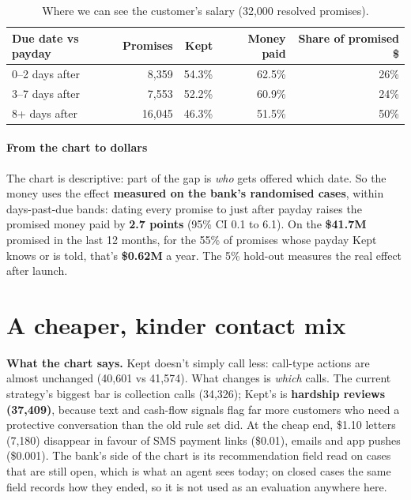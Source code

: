 \documentclass[11pt]{article}
\begin{document}
\begin{table}[htbp]\small\centering
\begin{tabular}{@{}lrrrr@{}}
\toprule
\textbf{Due date vs payday} & \textbf{Promises} & \textbf{Kept} & \textbf{Money paid} & \textbf{Share of promised \$} \\
\midrule
0–2 days after & 8,359 & 54.3\% & 62.5\% & 26\% \\
3–7 days after & 7,553 & 52.2\% & 60.9\% & 24\% \\
8+ days after & 16,045 & 46.3\% & 51.5\% & 50\% \\
\bottomrule
\end{tabular}
\caption{Where we can see the customer's salary (32,000 resolved promises).}
\end{table}

\paragraph{From the chart to dollars} The chart is descriptive: part of the gap is \emph{who} gets offered which
date. So the money uses the effect \textbf{measured on the bank's randomised cases}, within days-past-due bands: dating
every promise to just after payday raises the promised money paid by \textbf{2.7 points} (95\% CI 0.1 to 6.1). On the
\textbf{\$41.7M} promised in the last 12 months, for the 55\% of promises whose payday Kept knows or is told, that's
\textbf{\$0.62M} a year. The 5\% hold-out measures the real effect after launch.


\section{A cheaper, kinder contact mix}


\textbf{What the chart says.} Kept doesn't simply call less: call-type actions are almost unchanged (40,601 vs 41,574).
What changes is \emph{which} calls. The current strategy's biggest bar is collection calls (34,326); Kept's is
\textbf{hardship reviews (37,409)}, because text and cash-flow signals flag far more customers who need a protective
conversation than the old rule set did. At the cheap end, \$1.10 letters (7,180) disappear in favour of SMS payment links
(\$0.01), emails and app pushes (\$0.001).
The bank's side of the chart is its recommendation field read on cases that are still open, which is what an agent sees today; on closed cases the same field records how they ended, so it is not used as an evaluation anywhere here.
\end{document}
